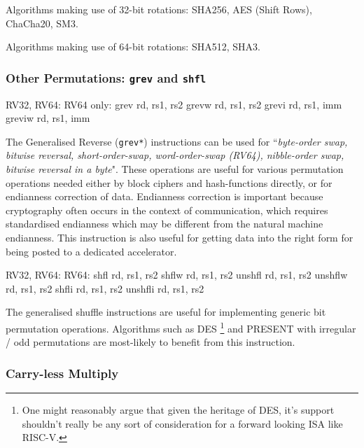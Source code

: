 Algorithms making use of 32-bit rotations:
SHA256, AES (Shift Rows), ChaCha20, SM3.

Algorithms making use of 64-bit rotations:
SHA512, SHA3.

\subsubsection{Other Permutations: {\tt grev} and {\tt shfl}}

\begin{cryptobitmanipisa}
RV32, RV64:                         RV64 only:
    grev rd, rs1, rs2                   grevw rd, rs1, rs2
    grevi rd, rs1, imm                  greviw rd, rs1, imm
\end{cryptobitmanipisa}

The Generalised Reverse ({\tt grev*}) instructions can be used for 
``{\em byte-order swap, bitwise reversal, short-order-swap,
word-order-swap (RV64), nibble-order swap, bitwise reversal in a byte}".
These operations are useful for various permutation operations
needed either by block ciphers and hash-functions directly, or for
endianness correction of data.
Endianness correction is important because
cryptography often occurs in the context of communication, which requires
standardised endianness which may be different from the natural machine
endianness.
This instruction is also useful for getting data into the right form
for being posted to a dedicated accelerator.

\begin{cryptobitmanipisa}
RV32, RV64:                         RV64:
    shfl    rd, rs1, rs2                shflw   rd, rs1, rs2
    unshfl  rd, rs1, rs2                unshflw rd, rs1, rs2
    shfli   rd, rs1, rs2
    unshfli rd, rs1, rs2
\end{cryptobitmanipisa}

The generalised shuffle instructions are useful for implementing
generic bit permutation operations.
Algorithms such as 
DES \footnote{
One might reasonably argue that given the heritage of DES, it's support
shouldn't really be any sort of consideration for a forward looking
ISA like RISC-V.
}
and
PRESENT\cite{block:present} with
irregular / odd permutations are most-likely to benefit from this
instruction.


\subsubsection{Carry-less Multiply}

